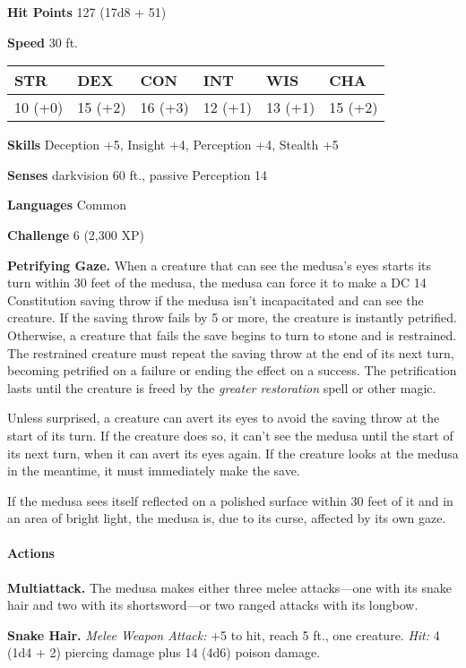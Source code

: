 \documentclass[
]{article}
\begin{document}
\textbf{Hit Points} 127 (17d8 + 51)

\textbf{Speed} 30 ft.

\begin{longtable}[]{@{}llllll@{}}
\toprule
STR & DEX & CON & INT & WIS & CHA\tabularnewline
\midrule
\endhead
10 (+0) & 15 (+2) & 16 (+3) & 12 (+1) & 13 (+1) & 15 (+2)\tabularnewline
\bottomrule
\end{longtable}

\textbf{Skills} Deception +5, Insight +4, Perception +4, Stealth +5

\textbf{Senses} darkvision 60 ft., passive Perception 14

\textbf{Languages} Common

\textbf{Challenge} 6 (2,300 XP)

\textbf{Petrifying Gaze.} When a creature that can see the medusa's eyes
starts its turn within 30 feet of the medusa, the medusa can force it to
make a DC 14 Constitution saving throw if the medusa isn't incapacitated
and can see the creature. If the saving throw fails by 5 or more, the
creature is instantly petrified. Otherwise, a creature that fails the
save begins to turn to stone and is restrained. The restrained creature
must repeat the saving throw at the end of its next turn, becoming
petrified on a failure or ending the effect on a success. The
petrification lasts until the creature is freed by the \emph{greater
restoration} spell or other magic.

Unless surprised, a creature can avert its eyes to avoid the saving
throw at the start of its turn. If the creature does so, it can't see
the medusa until the start of its next turn, when it can avert its eyes
again. If the creature looks at the medusa in the meantime, it must
immediately make the save.

If the medusa sees itself reflected on a polished surface within 30 feet
of it and in an area of bright light, the medusa is, due to its curse,
affected by its own gaze.

\hypertarget{actions-2}{%
\paragraph{Actions}\label{actions-2}}

\textbf{Multiattack.} The medusa makes either three melee attacks---one
with its snake hair and two with its shortsword---or two ranged attacks
with its longbow.

\textbf{Snake Hair.} \emph{Melee Weapon Attack:} +5 to hit, reach 5 ft.,
one creature. \emph{Hit:} 4 (1d4 + 2) piercing damage plus 14 (4d6)
poison damage.
\end{document}
